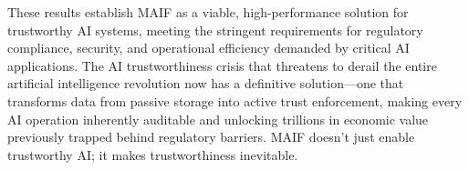 \documentclass[conference]{IEEEtran}
\begin{document}
These results establish MAIF as a viable, high-performance solution for trustworthy AI systems, meeting the stringent requirements for regulatory compliance, security, and operational efficiency demanded by critical AI applications. The AI trustworthiness crisis that threatens to derail the entire artificial intelligence revolution now has a definitive solution—one that transforms data from passive storage into active trust enforcement, making every AI operation inherently auditable and unlocking trillions in economic value previously trapped behind regulatory barriers. MAIF doesn't just enable trustworthy AI; it makes trustworthiness inevitable.
\end{document}
